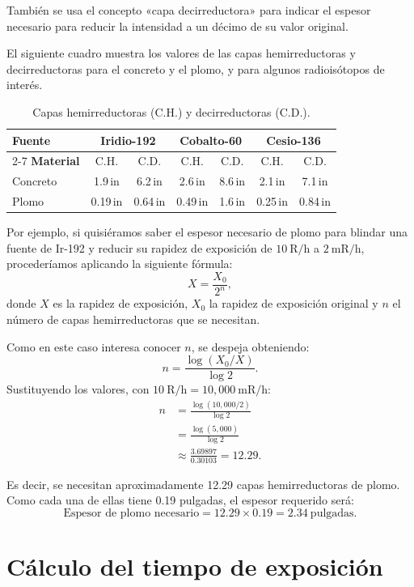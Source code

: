 También se usa el concepto «capa decirreductora» para indicar el espesor necesario para reducir la intensidad a un décimo de su valor original.

El siguiente cuadro muestra los valores de las capas hemirreductoras y decirreductoras para el concreto y el plomo, y para algunos radioisótopos de interés.

\begin{table}[ht]
\centering
\caption{Capas hemirreductoras (C.H.) y decirreductoras (C.D.).}
\label{tab:capas-reductoras}
\begin{tabular}{|l|c|c|c|c|c|c|}
\hline
\textbf{Fuente} & \multicolumn{2}{c|}{\textbf{Iridio-192}} & \multicolumn{2}{c|}{\textbf{Cobalto-60}} & \multicolumn{2}{c|}{\textbf{Cesio-136}} \\
\cline{2-7}
\textbf{Material} & C.H. & C.D. & C.H. & C.D. & C.H. & C.D. \\
\hline
Concreto & 1.9\,in & 6.2\,in & 2.6\,in & 8.6\,in & 2.1\,in & 7.1\,in \\
Plomo    & 0.19\,in & 0.64\,in & 0.49\,in & 1.6\,in & 0.25\,in & 0.84\,in \\
\hline
\end{tabular}
\end{table}

Por ejemplo, si quisiéramos saber el espesor necesario de plomo para blindar una fuente de Ir-192 y reducir su rapidez de exposición de $10\ \mathrm{R/h}$ a $2\ \mathrm{mR/h}$, procederíamos aplicando la siguiente fórmula:
\[
X=\frac{X_0}{2^n},
\]
donde $X$ es la rapidez de exposición, $X_0$ la rapidez de exposición original y $n$ el número de capas hemirreductoras que se necesitan.

Como en este caso interesa conocer $n$, se despeja obteniendo:
\[
n=\frac{\log(X_0/X)}{\log 2}.
\]
Sustituyendo los valores, con $10\ \mathrm{R/h}=10{,}000\ \mathrm{mR/h}$:
\begin{align*}
n &= \frac{\log(10{,}000/2)}{\log 2}\\
  &= \frac{\log(5{,}000)}{\log 2}\\
  &\approx \frac{3.69897}{0.30103}=12.29.
\end{align*}

Es decir, se necesitan aproximadamente 12.29 capas hemirreductoras de plomo. Como cada una de ellas tiene 0.19 pulgadas, el espesor requerido será:
\[
\text{Espesor de plomo necesario}=12.29\times0.19=2.34\ \text{pulgadas}.
\]

\section{Cálculo del tiempo de exposición}

